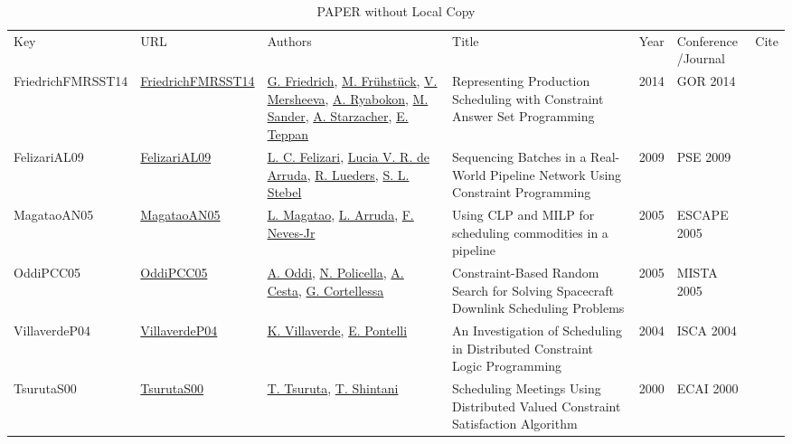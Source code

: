 {\scriptsize
\begin{longtable}{p{2cm}p{2cm}p{5cm}p{10cm}rp{3cm}l}
\rowcolor{white}\caption{PAPER without Local Copy}\\ \toprule
\rowcolor{white}Key & URL & Authors & Title & Year & \shortstack{Conference\\/Journal} & Cite\\ \midrule
\endhead
\bottomrule
\endfoot
FriedrichFMRSST14 & \href{https://doi.org/10.1007/978-3-319-28697-6_23}{FriedrichFMRSST14} & \hyperref[auth:a602]{G. Friedrich}, \hyperref[auth:a603]{M. Fr{\"{u}}hst{\"{u}}ck}, \hyperref[auth:a604]{V. Mersheeva}, \hyperref[auth:a605]{A. Ryabokon}, \hyperref[auth:a606]{M. Sander}, \hyperref[auth:a607]{A. Starzacher}, \hyperref[auth:a608]{E. Teppan} & Representing Production Scheduling with Constraint Answer Set Programming & 2014 & GOR 2014 & \cite{FriedrichFMRSST14}\\
FelizariAL09 & \href{https://www.sciencedirect.com/science/article/pii/S1570794605800136}{FelizariAL09} & \hyperref[auth:a1463]{L. C. Felizari}, \hyperref[auth:a1464]{Lucia V. R. de Arruda}, \hyperref[auth:a1465]{R. Lueders}, \hyperref[auth:a1466]{S. L. Stebel} & Sequencing Batches in a Real-World Pipeline Network Using Constraint Programming & 2009 & PSE 2009 & \cite{FelizariAL09}\\
MagataoAN05 & \href{https://www.sciencedirect.com/science/article/pii/S1570794605800136}{MagataoAN05} & \hyperref[auth:a1470]{L. Magatao}, \hyperref[auth:a1471]{L. Arruda}, \hyperref[auth:a1472]{F. Neves-Jr} & Using CLP and MILP for scheduling commodities in a pipeline & 2005 & ESCAPE 2005 & \cite{MagataoAN05}\\
OddiPCC05 & \href{http://dx.doi.org/10.1007/0-387-27744-7_7}{OddiPCC05} & \hyperref[auth:a282]{A. Oddi}, \hyperref[auth:a283]{N. Policella}, \hyperref[auth:a284]{A. Cesta}, \hyperref[auth:a285]{G. Cortellessa} & Constraint-Based Random Search for Solving Spacecraft Downlink Scheduling Problems & 2005 & MISTA 2005 & \cite{OddiPCC05}\\
VillaverdeP04 & \href{}{VillaverdeP04} & \hyperref[auth:a658]{K. Villaverde}, \hyperref[auth:a33]{E. Pontelli} & An Investigation of Scheduling in Distributed Constraint Logic Programming & 2004 & ISCA 2004 & \cite{VillaverdeP04}\\
TsurutaS00 & \href{}{TsurutaS00} & \hyperref[auth:a1267]{T. Tsuruta}, \hyperref[auth:a1268]{T. Shintani} & Scheduling Meetings Using Distributed Valued Constraint Satisfaction Algorithm & 2000 & ECAI 2000 & \cite{TsurutaS00}\\

\end{longtable}}
